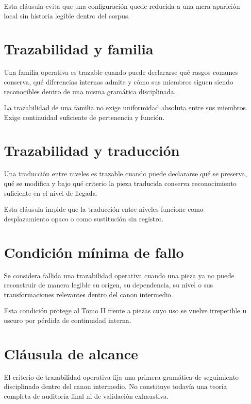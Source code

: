 \begin{observation}
Esta cláusula evita que una configuración quede reducida a una mera aparición local sin historia legible dentro del corpus.
\end{observation}

\section{Trazabilidad y familia}
\begin{definition}
Una familia operativa es trazable cuando puede declararse qué rasgos comunes conserva, qué diferencias internas admite y cómo sus miembros siguen siendo reconocibles dentro de una misma gramática disciplinada.
\end{definition}

\begin{observation}
La trazabilidad de una familia no exige uniformidad absoluta entre sus miembros. Exige continuidad suficiente de pertenencia y función.
\end{observation}

\section{Trazabilidad y traducción}
\begin{definition}
Una traducción entre niveles es trazable cuando puede declararse qué se preserva, qué se modifica y bajo qué criterio la pieza traducida conserva reconocimiento suficiente en el nivel de llegada.
\end{definition}

\begin{observation}
Esta cláusula impide que la traducción entre niveles funcione como desplazamiento opaco o como sustitución sin registro.
\end{observation}

\section{Condición mínima de fallo}
\begin{definition}
Se considera fallida una trazabilidad operativa cuando una pieza ya no puede reconstruir de manera legible su origen, su dependencia, su nivel o sus transformaciones relevantes dentro del canon intermedio.
\end{definition}

\begin{observation}
Esta condición protege al Tomo II frente a piezas cuyo uso se vuelve irrepetible u oscuro por pérdida de continuidad interna.
\end{observation}

\section{Cláusula de alcance}
\begin{observation}
El criterio de trazabilidad operativa fija una primera gramática de seguimiento disciplinado dentro del canon intermedio. No constituye todavía una teoría completa de auditoría final ni de validación exhaustiva.
\end{observation}

